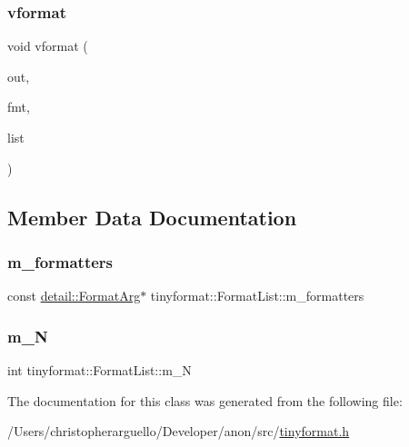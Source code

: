 \subsubsection{\texorpdfstring{vformat}{vformat}}
{\footnotesize\ttfamily void vformat (\begin{DoxyParamCaption}\item[{std\+::ostream \&}]{out,  }\item[{const char $\ast$}]{fmt,  }\item[{const \mbox{\hyperlink{classtinyformat_1_1_format_list}{Format\+List}} \&}]{list }\end{DoxyParamCaption})\hspace{0.3cm}{\ttfamily [friend]}}



\subsection{Member Data Documentation}
\mbox{\label{classtinyformat_1_1_format_list_a90b0b9b03a90c09e8734b51f8be3f734}} 
\subsubsection{\texorpdfstring{m\+\_\+formatters}{m\_formatters}}
{\footnotesize\ttfamily const \mbox{\hyperlink{classtinyformat_1_1detail_1_1_format_arg}{detail\+::\+Format\+Arg}}$\ast$ tinyformat\+::\+Format\+List\+::m\+\_\+formatters\hspace{0.3cm}{\ttfamily [private]}}

\mbox{\label{classtinyformat_1_1_format_list_aee4267e50285b7adeb57b61d6305312b}} 
\subsubsection{\texorpdfstring{m\+\_\+N}{m\_N}}
{\footnotesize\ttfamily int tinyformat\+::\+Format\+List\+::m\+\_\+N\hspace{0.3cm}{\ttfamily [private]}}



The documentation for this class was generated from the following file\+:\begin{DoxyCompactItemize}
\item 
/\+Users/christopherarguello/\+Developer/anon/src/\mbox{\hyperlink{tinyformat_8h}{tinyformat.\+h}}\end{DoxyCompactItemize}
